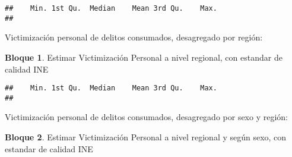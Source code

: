 \documentclass[
]{book}
\newenvironment{Shaded}{\begin{snugshade}}{\end{snugshade}}
\newcommand{\AttributeTok}[1]{\textcolor[rgb]{0.77,0.63,0.00}{#1}}
\newcommand{\FunctionTok}[1]{\textcolor[rgb]{0.00,0.00,0.00}{#1}}
\newcommand{\NormalTok}[1]{#1}
\newcommand{\OtherTok}[1]{\textcolor[rgb]{0.56,0.35,0.01}{#1}}
\newcommand{\SpecialCharTok}[1]{\textcolor[rgb]{0.00,0.00,0.00}{#1}}
\newcommand{\StringTok}[1]{\textcolor[rgb]{0.31,0.60,0.02}{#1}}
\theoremstyle{definition}
\theoremstyle{definition}
\newtheorem{example}{Bloque}[chapter]
\theoremstyle{definition}
\theoremstyle{definition}
\theoremstyle{remark}
\begin{document}
\begin{verbatim}
##    Min. 1st Qu.  Median    Mean 3rd Qu.    Max. 
## 
\end{verbatim}

Victimización personal de delitos consumados, desagregado por región:

\begin{example}
\protect\hypertarget{exm:bloque78nbm}{}\label{exm:bloque78nbm}Estimar Victimización Personal a nivel regional, con estandar de calidad INE
\end{example}

\begin{Shaded}
\end{Shaded}

\begin{verbatim}
##    Min. 1st Qu.  Median    Mean 3rd Qu.    Max. 
## 
\end{verbatim}

Victimización personal de delitos consumados, desagregado por sexo y región:

\begin{example}
\protect\hypertarget{exm:bloque79nbm}{}\label{exm:bloque79nbm}Estimar Victimización Personal a nivel regional y según sexo, con estandar de calidad INE
\end{example}

\begin{Shaded}
\end{Shaded}
\end{document}
